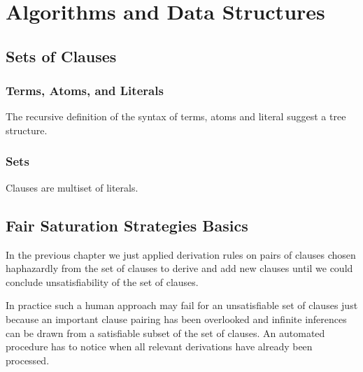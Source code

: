 
\chapter{Algorithms and Data Structures}

\section{Sets of Clauses}

\subsection{Terms, Atoms, and Literals}

The recursive definition of the syntax of terms, atoms and literal suggest a tree structure.



\subsection{Sets}

Clauses are multiset of literals.


\section{Fair Saturation Strategies Basics}

In the previous chapter we just applied derivation rules
on pairs of clauses chosen haphazardly from the set of clauses
to derive and add new clauses
until we could conclude unsatisfiability of the set of clauses.

In practice such a human approach may fail for an unsatisfiable set of clauses
just because an important clause pairing has been overlooked
and infinite inferences can be drawn from a satisfiable subset of the set of clauses.
An automated procedure has to notice when all relevant derivations
have already been processed.


